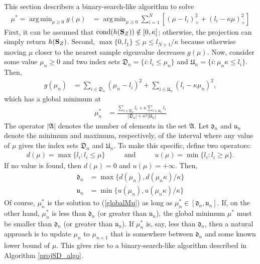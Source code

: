 \documentclass[11pt]{article}
\DeclareMathOperator*{\argmin}{arg\,min}
\theoremstyle{definition}
\theoremstyle{definition}
\def\SS{{\bf S}}
\def\cond{\text{cond}}
\begin{document}
This section describers a binary-search-like algorithm to solve
\begin{align}
\mu^* = \argmin_{\mu \geq 0 }g(\mu) &=\argmin_{\mu \geq 0 }\sum_{i=1}^{N} \left[ \left(\mu-l_i\right)^2_+ + \left(l_i - \kappa\mu\right)^2_+ \right] \label{globalMu}
\end{align}
First, it can be assumed that $\cond(h(\SS_Z)) \notin [0,\kappa]$; otherwise, the projection can simply return $h(\SS_Z)$. Second, $\max\{0, l_1\} \leq \mu \leq l_{N+1}/\kappa$ because otherwise moving $\mu$ closer to the nearest sample eigenvalue decreases $g(\mu)$. Now, consider some value $\mu_n \geq 0$ and two index sets $\mathfrak{D}_n = \{i : l_i \leq \mu_n\}$ and $\mathfrak{U}_n = \{i : \mu_n\kappa \leq  l_i \}$. Then,
\begin{align*}
g(\mu_n) &= \sum_{i \in \mathfrak{D}_n}  \left(\mu_n-l_i\right)^2  + \sum_{i \in \mathfrak{U}_n} \left(l_i - \kappa\mu_n\right)^2,
\end{align*}
 which has a global minimum at 
\begin{align*}
\mu_n^* &= \frac{\sum_{i \in \mathfrak{D}_n} l_i  + \kappa \sum_{i \in \mathfrak{U}_n} l_i }{|\mathfrak{D}_n | + \kappa^2 |\mathfrak{U}_n|}
\end{align*}
 The operator $|\mathfrak{A}|$ denotes the number of elements in the set $\mathfrak{A}$.  Let $\mathfrak{d}_n$ and $\mathfrak{u}_n$ denote the minimum and maximum, respectively, of the interval where any value of $\mu$ gives the index sets $\mathfrak{D}_n$ and $\mathfrak{U}_n$. To make this specific, define two operators:
 \begin{align*}
 d(\mu) = \max\{l_i : l_i \leq \mu\} &&& \text{ and } &&& u(\mu) = \min\{l_i : l_i \geq \mu\}.
\end{align*} 
If no value is found, then $d(\mu) = 0$ and $u(\mu) = +\infty$.  Then, 
 \begin{align*}
\mathfrak{d}_n &= \max \{d(\mu_n), d(\mu_n\kappa)/\kappa\}\\
\mathfrak{u}_n &= \min \{u(\mu_n), u(\mu_n\kappa)/\kappa\}
\end{align*}
 Of course, $\mu^*_n$ is the solution to (\ref{globalMu}) as long as $\mu_n^* \in [\mathfrak{d}_n, \mathfrak{u}_n]$. If, on the other hand, $\mu_n^*$ is less than $\mathfrak{d}_n$ (or greater than $\mathfrak{u}_n$), the global minimum $\mu^*$ must be smaller than $\mathfrak{d}_n$ (or greater than $\mathfrak{u}_n$). If $\mu_n^*$ is, say, less than $\mathfrak{d}_n$, then a natural approach is to update $\mu_n$ to $\mu_{n+1}$ that is somewhere between $\mathfrak{d}_n$ and some known lower bound of $\mu$.  This gives rise to a binary-search-like algorithm described in Algorithm \ref{projSD_algo}. 
 
\end{document}
